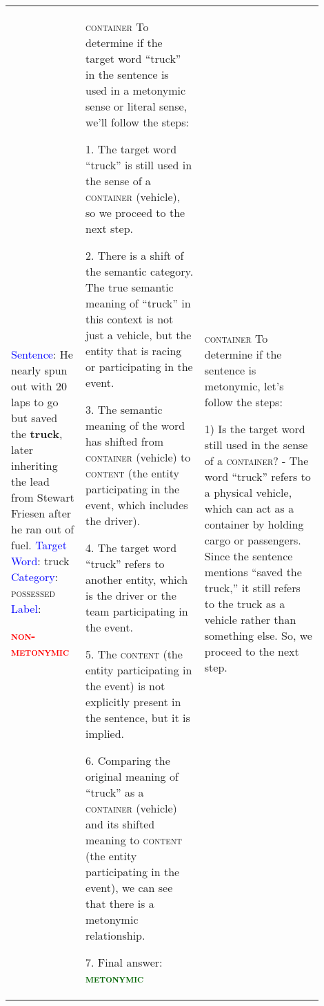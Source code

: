 \documentclass[11pt]{article}
\newcommand{\tr}[1]{\textcolor{red}{#1}}
\newcommand{\tg}[1]{\textcolor{darkgreen}{#1}}
\newcommand{\tb}[1]{\textcolor{blue}{#1}}
\begin{document}
{\begin{longtable}{|p{0.20\linewidth}|p{0.35\linewidth}|p{0.35\linewidth}|}
\hline




\tb{Sentence}: He nearly spun out with 20 laps to go but saved the \textbf{truck}, later inheriting the lead from Stewart Friesen after he ran out of fuel. \newline
\tb{Target Word}: truck \newline
\tb{Category}: \textsc{possessed} \newline
\tb{Label}: 

\tr{\textsc{\textbf{non-metonymic}}}

&

\textsc{container} \newline
To determine if the target word ``truck'' in the sentence is used in a metonymic sense or literal sense, we'll follow the steps:

1. The target word ``truck'' is still used in the sense of a \textsc{container} (vehicle), so we proceed to the next step.

2. There is a shift of the semantic category. The true semantic meaning of ``truck'' in this context is not just a vehicle, but the entity that is racing or participating in the event.

3. The semantic meaning of the word has shifted from \textsc{container} (vehicle) to \textsc{content} (the entity participating in the event, which includes the driver).

4. The target word ``truck'' refers to another entity, which is the driver or the team participating in the event.

5. The \textsc{content} (the entity participating in the event) is not explicitly present in the sentence, but it is implied.

6. Comparing the original meaning of ``truck'' as a \textsc{container} (vehicle) and its shifted meaning to \textsc{content} (the entity participating in the event), we can see that there is a metonymic relationship.

7. Final answer: \tg{\textsc{\textbf{metonymic}}}

&

\textsc{container} \newline
To determine if the sentence is metonymic, let's follow the steps:

1) Is the target word still used in the sense of a \textsc{container}? - The word ``truck'' refers to a physical vehicle, which can act as a container by holding cargo or passengers. Since the sentence mentions ``saved the truck,'' it still refers to the truck as a vehicle rather than something else. So, we proceed to the next step.


\end{longtable}}
\end{document}
